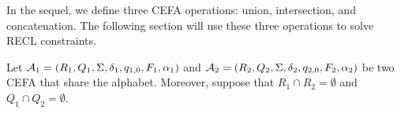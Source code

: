 %


In the sequel, we define three CEFA operations: union, intersection, and concatenation. The following section will use these three operations to solve RECL constraints. 

Let $\mathcal{A}_1 = (R_1, Q_1, \Sigma, \delta_1, q_{1,0}, F_1, \alpha_1)$ and  $\mathcal{A}_2 = (R_2, Q_2, \Sigma, \delta_2, q_{2,0}, F_2, \alpha_2)$ be two CEFA that share the alphabet. 
Moreover, suppose that $R_1 \cap R_2 = \emptyset$ and $Q_1 \cap Q_2 = \emptyset$. 


